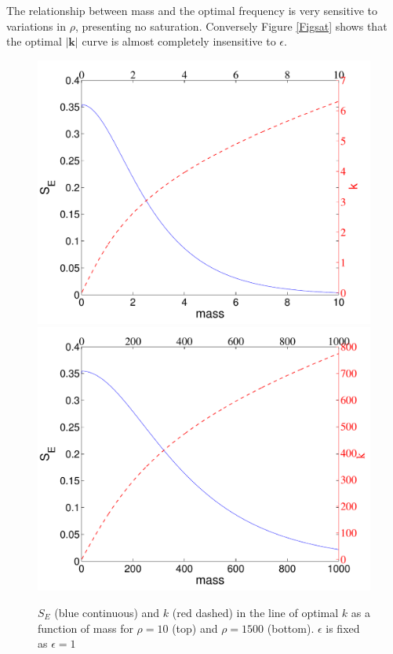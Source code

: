 The relationship between mass and the optimal frequency is very sensitive to variations in $\rho$, presenting no saturation. Conversely Figure \ref{Figsat} shows that the optimal $|\bm k|$ curve is almost completely insensitive to $\epsilon$. 

\begin{figure}[H]
\begin{center}
\includegraphics[width=.75\textwidth]{simultrho10}
\includegraphics[width=.75\textwidth]{simultrho1500}
\end{center}
\caption{ $S_E$ (blue continuous) and $k$ (red dashed) in the line of optimal $k$ as a function of mass for $\rho=10$ (top) and $\rho=1500$ (bottom). $\epsilon$ is fixed as $\epsilon=1$}
\label{Fig10}
\end{figure}

